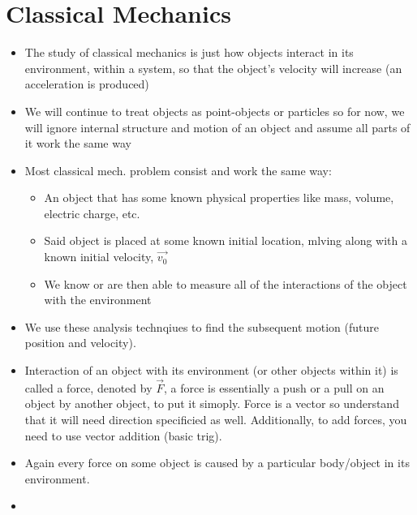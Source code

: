 \documentclass[openany]{book}
\begin{document}
\section{Classical Mechanics}
    \begin{itemize}
    \item The study of classical mechanics is just how objects interact in its environment, within a system, so that the object's velocity will increase (an acceleration is produced)
    \item We will continue to treat objects as point-objects or particles so for now, we will ignore internal structure and motion of an object and assume all parts of it work the same way
    \item Most classical mech. problem consist and work the same way:
    \begin{itemize}
        \item An object that has some known physical properties like mass, volume, electric charge, etc.
        \item Said object is placed at some known initial location, mlving along with a known initial velocity, $\vec{v_0}$
        \item We know or are then able to measure all of the interactions of the object with the environment
    \end{itemize}
    \item We use these analysis technqiues to find the subsequent motion (future position and velocity).
    \item Interaction of an object with its environment (or other objects within it) is called a force, denoted by $\vec{F}$, a force is essentially a push or a pull on an object by another object, to put it simoply. Force is a vector so understand that it will need direction specificied as well. Additionally, to add forces, you need to use vector addition (basic trig).
    \item Again every force on some object is caused by a particular body/object in its environment.
    \item 
    \end{itemize}
\end{document}
